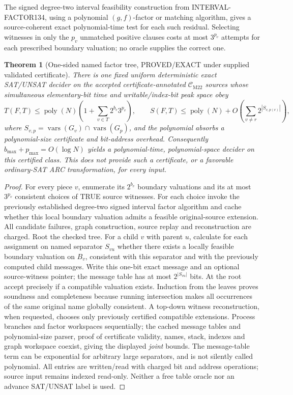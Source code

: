 \documentclass[11pt]{article}
\newtheorem{theorem}{Theorem}
\newcommand{\CM}{\mathcal C_{\mathrm{M22}}}
\begin{document}
The signed degree-two interval feasibility construction from INTERVAL-FACTOR134, using a polynomial \((g,f)\)-factor or matching algorithm, gives a source-coherent exact polynomial-time test for each such residual. Selecting witnesses in only the \(p_v\) unmatched positive clauses costs at most \(3^{p_v}\) attempts for each prescribed boundary valuation; no oracle supplies the correct one.

\begin{theorem}[One-sided named factor tree, PROVED/EXACT under supplied validated certificate]
There is one fixed uniform deterministic exact SAT/UNSAT decider on the accepted certificate-annotated \(\CM\) sources whose \emph{simultaneous} elementary-bit time and writable/index-bit peak space obey
\[
 T(F,T)\le \operatorname{poly}(N)
 \left(1+\sum_{v\in T}2^{b_v}3^{p_v}\right),\qquad
 S(F,T)\le\operatorname{poly}(N)+O\!\left(\sum_{v\ne r}2^{|S_{v,p(v)}|}\right),
\]
where \(S_{v,p}=\operatorname{vars}(G_v)\cap\operatorname{vars}(G_p)\), and the polynomial absorbs a polynomial-size certificate and bit-address overhead. Consequently \(b_{\max}+p_{\max}=O(\log N)\) yields a polynomial-time, polynomial-space decider \emph{on this certified class}. This does not provide such a certificate, or a favorable ordinary-SAT ARC transformation, for every input.
\end{theorem}
\begin{proof}
For every piece \(v\), enumerate its \(2^{b_v}\) boundary valuations and its at most \(3^{p_v}\) consistent choices of TRUE source witnesses. For each choice invoke the previously established degree-two signed interval factor algorithm and cache whether this local boundary valuation admits a feasible original-source extension. All candidate failures, graph construction, source replay and reconstruction are charged. Root the checked tree. For a child \(v\) with parent \(u\), calculate for each assignment on named separator \(S_{vu}\) whether there exists a locally feasible boundary valuation on \(B_v\), consistent with this separator and with the previously computed child messages. Write this one-bit exact message and an optional source-witness pointer; the message table has at most \(2^{|S_{vu}|}\) bits. At the root accept precisely if a compatible valuation exists. Induction from the leaves proves soundness and completeness because running intersection makes all occurrences of the same original name globally consistent. A top-down witness reconstruction, when requested, chooses only previously certified compatible extensions. Process branches and factor workspaces sequentially; the cached message tables and polynomial-size parser, proof of certificate validity, names, stack, indexes and graph workspace coexist, giving the displayed \emph{joint} bounds. The message-table term can be exponential for arbitrary large separators, and is not silently called polynomial. All entries are written/read with charged bit and address operations; source input remains indexed read-only. Neither a free table oracle nor an advance SAT/UNSAT label is used.
\end{proof}
\end{document}
